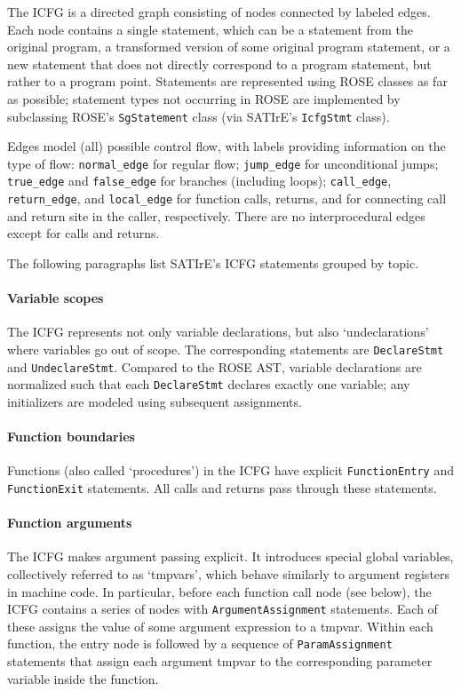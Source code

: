 \documentclass[a4paper,12pt]{report}
\begin{document}
The ICFG is a directed graph consisting of nodes connected by labeled edges.
Each node contains a single statement, which can be a statement from the
original program, a transformed version of some original program statement,
or a new statement that does not directly correspond to a program statement,
but rather to a program point. Statements are represented using ROSE classes
as far as possible; statement types not occurring in ROSE are implemented by
subclassing ROSE's \texttt{SgStatement} class (via SATIrE's
\texttt{IcfgStmt} class).

Edges model (all) possible control flow, with labels providing information
on the type of flow: \verb|normal_edge| for regular flow; \verb|jump_edge|
for unconditional jumps; \verb|true_edge| and \verb|false_edge| for branches
(including loops); \verb|call_edge|, \verb|return_edge|, and
\verb|local_edge| for function calls, returns, and for connecting call and
return site in the caller, respectively. There are no interprocedural edges
except for calls and returns.

The following paragraphs list SATIrE's ICFG statements grouped by topic.

\paragraph{Variable scopes} The ICFG represents not only variable
declarations, but also `undeclarations' where variables go out of scope. The
corresponding statements are \verb|DeclareStmt| and \verb|UndeclareStmt|.
Compared to the ROSE AST, variable declarations are normalized such that
each \verb|DeclareStmt| declares exactly one variable; any initializers are
modeled using subsequent assignments.

\paragraph{Function boundaries} Functions (also called `procedures') in the
ICFG have explicit \verb|FunctionEntry| and \verb|FunctionExit| statements.
All calls and returns pass through these statements.

\paragraph{Function arguments} The ICFG makes argument passing explicit. It
introduces special global variables, collectively referred to as `tmpvars',
which behave similarly to argument registers in machine code. In particular,
before each function call node (see below), the ICFG contains a series of
nodes with \verb|ArgumentAssignment| statements. Each of these assigns the
value of some argument expression to a tmpvar. Within each function, the
entry node is followed by a sequence of \verb|ParamAssignment| statements
that assign each argument tmpvar to the corresponding parameter variable
inside the function.
\end{document}
